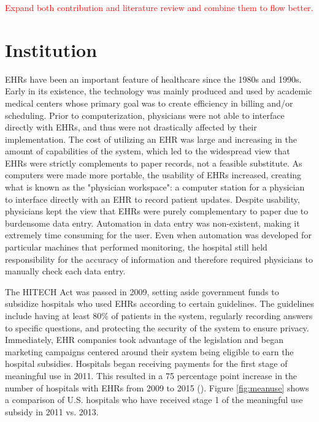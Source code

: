 \documentclass[11pt]{article}
\begin{document}
\textcolor{red}{Expand both contribution and literature review and combine them to flow better.}


\newpage


\section{Institution}

EHRs have been an important feature of healthcare since the 1980s and 1990s. Early in its existence, the technology was mainly produced and used by academic medical centers whose primary goal was to create efficiency in billing and/or scheduling. Prior to computerization, physicians were not able to interface directly with EHRs, and thus were not drastically affected by their implementation. The cost of utilizing an EHR was large and increasing in the amount of capabilities of the system, which led to the widespread view that EHRs were strictly complements to paper records, not a feasible substitute. As computers were made more portable, the usability of EHRs increased, creating what is known as the "physician workspace": a computer station for a physician to interface directly with an EHR to record patient updates. Despite usability, physicians kept the view that EHRs were purely complementary to paper due to burdensome data entry. Automation in data entry was non-existent, making it extremely time consuming for the user. Even when automation was developed for particular machines that performed monitoring, the hospital still held responsibility for the accuracy of information and therefore required physicians to manually check each data entry. 

The HITECH Act was passed in 2009, setting aside government funds to subsidize hospitals who used EHRs according to certain guidelines. The guidelines include having at least 80\% of patients in the system, regularly recording answers to specific questions, and protecting the security of the system to ensure privacy. Immediately, EHR companies took advantage of the legislation and began marketing campaigns centered around their system being eligible to earn the hospital subsidies. Hospitals began receiving payments for the first stage of meaningful use in 2011. This resulted in a 75 percentage point increase in the number of hospitals with EHRs from 2009 to 2015 (\cite{stats}). Figure \ref{fig:meanuse} shows a comparison of U.S. hospitals who have received stage 1 of the meaningful use subsidy in 2011 vs. 2013. 
\end{document}
